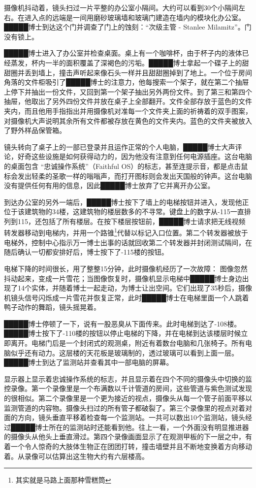 \begin{scpbox}

摄像机抖动着，镜头扫过一片平整的办公室小隔间。大约可以看到30个小隔间左右。在进入点的远端是一间用磨砂玻璃墙和玻璃门建造在墙内的模块化办公室。█████博士到达这个门并调查了门上的蚀刻：“次级主管 - Stanlee Milamitz”。门没有锁上。

█████博士进入了办公室并检查桌面。桌上有一个咖啡杯，由于杯子内的液体已经蒸发，杯内一半的面积覆盖了深褐色的污垢。█████博士拿起一个碟子上的甜甜圈并丢到墙上，撞击声听起来像石头一样并且甜甜圈掉到了地上。一个位于房间角落的文件柜吸引了█████博士的注意力，他每搜索一个架子，就在第二个抽屉上停下并抽出一份文件，又回到第一个架子抽出另外两份文件。到了第三和第四个抽屉，他取出了另外四份文件并放在桌子上全部翻开。文件全部存放于蓝色的文件夹内，而且他用手指指出并用摄像机对准每一个文件夹上面的祈祷着的双手图案，对摄像机大声说明其余所有文件都被存放在黄色的文件夹内。蓝色的文件夹被放入了野外样品保管箱。

镜头转向了桌子上的一部已登录并且运作正常的个人电脑，█████博士大声评论，好奇这些设施是如何获得动力的，因为他没有注意到任何电源插座。这台电脑的桌面包含 “忠诚操作系统”（Faithful OS）的标志，甚至连提示音，都是点击鼠标会发出轻柔的圣歌一样的嗡嗡声，而打开图标则会发出天国般的钟声。这台电脑没有提供任何有用的信息，因此█████博士放弃了它并离开办公室。

到达办公室的另外一端后，█████博士按下了墙上的电梯按钮并进入，发现他正位于该建筑物的34楼，这建筑物的楼层数多的不寻常。键盘上的数字从-115一直排列到115，还包括了所有楼层。在按下楼层按钮前，█████博士请求把无线视频转发器移动到电梯内，并用一个路锥\footnote{其实就是马路上面那种雪糕筒}代替以标记入口位置。第二个转发器被放于电梯外，控制中心指示万一博士出事的话就回收第二个转发器并封闭测试隔间，在随后确认一切都安排好后，博士按下了-115楼的按钮。

电梯下降的时间很长，用了整整15分钟，此时摄像机经历了一次故障： 图像忽然抖动起来，变成一片雪花；当图像恢复时，摄像机显示电梯中█████博士身边出现了14个实体，并随着博士一起走动，为博士让出空间。它们出现了35秒后，摄像机镜头信号闪烁成一片雪花并恢复正常，此时█████博士在电梯里面一个人跳着鸭子动作的舞蹈，镜头摇晃着。

█████博士停顿了一下，说有一股恶臭从下面传来。此时电梯到达了-108楼。█████博士按下了-110楼的按钮以停止电梯的下降，并在电梯到达该楼层时候立即离开。电梯门后是一个封闭式的观测桌，附近有着数台电脑和几张椅子。所有电脑似乎还有动力。这层楼的天花板是玻璃制的，透过玻璃可以看到上面一层。█████博士到达了监测站并查看其中一部电脑的屏幕。

显示器上显示着忠诚操作系统的标志，并且显示着在四个不同的摄像头中切换的监控录像。第一个录像里是一个布满数以千计管道的房间，这些管道与紫色测试发现的很相似。第二个录像里是一个更为接近的视点，摄像头从每一个管子前面平移以监测管道的内容物。摄像头扫过的所有管子都破裂了。第三个录像里的视点对着对面的方向，镜头垂直平移着检查每一个监测站。一共可以数出10个监测站，镜头经过█████博士所在的监测站时还能看到他。往上一看，一个外面没有明显推进器的摄像头从他头上垂直滑过。第四个录像画面显示了在观测甲板的下一层之中，有着一个令人惊奇的大肢体生物正在团团打转，撞击墙壁并且不断地变换着方向移动着。从录像可以估算出这生物大约有六层楼高。


\end{scpbox}
